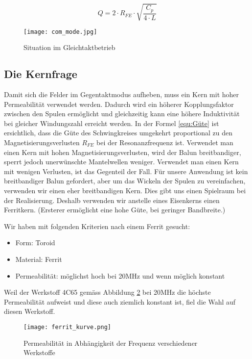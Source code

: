 \begin{equation}
Q = 2 \cdot R_{FE} \cdot \sqrt{\frac{C_{p}}{4 \cdot L}}
\label{equ:Güte}
\end{equation}

\begin{figure}[H]
	\centering
	\texttt{[image: com\_mode.jpg]}
	\caption{Situation im Gleichtaktbetrieb}\label{fig:com_mode}
\end{figure}

\subsection{Die Kernfrage}
Damit sich die Felder im Gegentaktmodus aufheben, muss ein Kern mit hoher Permeabilität verwendet werden. Dadurch wird ein höherer Kopplungsfaktor zwischen den Spulen ermöglicht und gleichzeitig kann eine höhere Induktivität bei gleicher Windungszahl erreicht werden. In der Formel \ref{equ:Güte} ist ersichtlich, dass die Güte des Schwingkreises umgekehrt proportional zu den Magnetisierungsverlusten $R_{FE}$  bei der Resonanzfrequenz ist. Verwendet man einen Kern mit hohen Magnetisierungsverlusten, wird der Balun breitbandiger, sperrt jedoch unerwünschte Mantelwellen weniger. Verwendet man einen Kern mit wenigen Verlusten, ist das Gegenteil der Fall.
Für unsere Anwendung ist kein breitbandiger Balun gefordert, aber um das Wickeln der Spulen zu vereinfachen, verwenden wir einen eher breitbandigen Kern. Dies gibt uns einen Spielraum bei der Realisierung. Deshalb verwenden wir anstelle eines Eisenkerns einen Ferritkern. (Ersterer ermöglicht eine hohe Güte, bei geringer Bandbreite.)


Wir haben mit folgenden Kriterien nach einem Ferrit gesucht:
\begin{itemize}
	\item Form: Toroid
	\item Material: Ferrit
	\item Permeabilität: möglichst hoch bei 20MHz und wenn möglich konstant
\end{itemize}

Weil der Werkstoff 4C65 gemäss Abbildung \ref{fig:ferrit_kurve} bei 20MHz die höchste Permeabilität aufweist und diese auch ziemlich konstant ist, fiel die Wahl auf diesen Werkstoff.

\begin{figure}[H]
	\centering
	\texttt{[image: ferrit\_kurve.png]}
	\caption{Permeabilität in Abhängigkeit der Frequenz verschiedener Werkstoffe}\label{fig:ferrit_kurve}
\end{figure}

